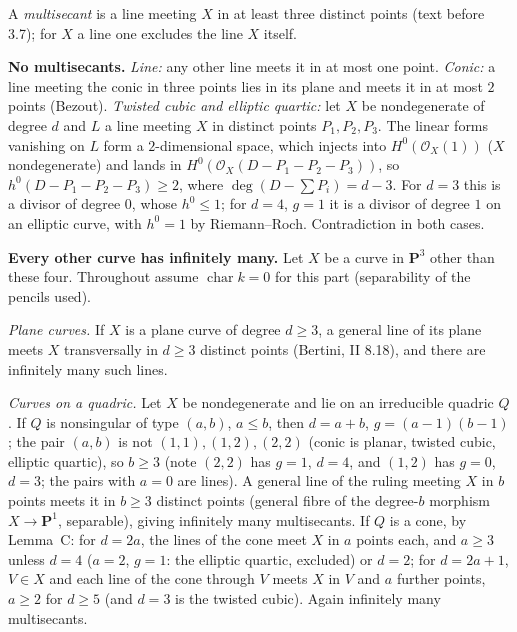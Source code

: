 \documentclass[11pt]{article}
\begin{document}
\pf
A \emph{multisecant} is a line meeting $X$ in at least three distinct points (text before 3.7); for $X$ a line one excludes the line $X$ itself.

\textbf{No multisecants.} \emph{Line:} any other line meets it in at most one point. \emph{Conic:} a line meeting the conic in three points lies in its plane and meets it in at most $2$ points (Bezout). \emph{Twisted cubic and elliptic quartic:} let $X$ be nondegenerate of degree $d$ and $L$ a line meeting $X$ in distinct points $P_1,P_2,P_3$. The linear forms vanishing on $L$ form a $2$-dimensional space, which injects into $H^0(\mathcal O_X(1))$ ($X$ nondegenerate) and lands in $H^0(\mathcal O_X(D-P_1-P_2-P_3))$, so $h^0(D-P_1-P_2-P_3)\ge2$, where $\deg(D-\sum P_i)=d-3$. For $d=3$ this is a divisor of degree $0$, whose $h^0\le1$; for $d=4$, $g=1$ it is a divisor of degree $1$ on an elliptic curve, with $h^0=1$ by Riemann--Roch. Contradiction in both cases.

\textbf{Every other curve has infinitely many.} Let $X$ be a curve in $\mathbf P^3$ other than these four. Throughout assume $\operatorname{char}k=0$ for this part (separability of the pencils used).

\emph{Plane curves.} If $X$ is a plane curve of degree $d\ge3$, a general line of its plane meets $X$ transversally in $d\ge3$ distinct points (Bertini, II 8.18), and there are infinitely many such lines.

\emph{Curves on a quadric.} Let $X$ be nondegenerate and lie on an irreducible quadric $Q$. If $Q$ is nonsingular of type $(a,b)$, $a\le b$, then $d=a+b$, $g=(a-1)(b-1)$; the pair $(a,b)$ is not $(1,1),(1,2),(2,2)$ (conic is planar, twisted cubic, elliptic quartic), so $b\ge3$ (note $(2,2)$ has $g=1$, $d=4$, and $(1,2)$ has $g=0$, $d=3$; the pairs with $a=0$ are lines). A general line of the ruling meeting $X$ in $b$ points meets it in $b\ge3$ distinct points (general fibre of the degree-$b$ morphism $X\to\mathbf P^1$, separable), giving infinitely many multisecants. If $Q$ is a cone, by Lemma~C: for $d=2a$, the lines of the cone meet $X$ in $a$ points each, and $a\ge3$ unless $d=4$ ($a=2$, $g=1$: the elliptic quartic, excluded) or $d=2$; for $d=2a+1$, $V\in X$ and each line of the cone through $V$ meets $X$ in $V$ and $a$ further points, $a\ge2$ for $d\ge5$ (and $d=3$ is the twisted cubic). Again infinitely many multisecants.
\end{document}
